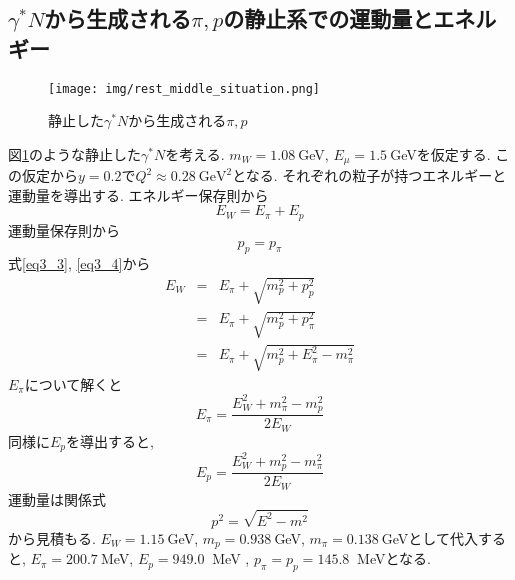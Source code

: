 \subsection{$\gamma^* N$から生成される$\pi,p$の静止系での運動量とエネルギー}
\begin{figure}[H]
    \centering
    \texttt{[image: img/rest\_middle\_situation.png]}
    \caption{静止した$\gamma^* N$から生成される$\pi,p$}
    \label{fig:angle5}
\end{figure}
図\ref{fig:angle5}のような静止した$\gamma^* N$を考える.
$m_W = 1.08 \ $GeV, $E_\mu = 1.5 \ $GeVを仮定する.
この仮定から$y = 0.2$で$Q^2 \approx 0.28 \ \mathrm{GeV^2}$となる.
それぞれの粒子が持つエネルギーと運動量を導出する.
エネルギー保存則から
\begin{equation}
    \label{eq3_3}
    E_W = E_\pi + E_p
\end{equation}
運動量保存則から
\begin{equation}
    \label{eq3_4}
    p_p = p_\pi
\end{equation}
式\ref{eq3_3}, \ref{eq3_4}から
\begin{eqnarray}
    E_W  & =  & E_\pi + \sqrt{m_p^2 + p_p^2} \\
    & = & E_\pi + \sqrt{m_p^2 + p_\pi^2} \\
    & = & E_\pi + \sqrt{m_p^2 + E_\pi^2 - m_\pi^2}
\end{eqnarray}
$E_\pi$について解くと
\begin{equation}
    E_\pi = \dfrac{E_W ^2 + m_\pi ^2 - m_p ^2}{2E_W}
\end{equation}
同様に$E_p$を導出すると,
\begin{equation}
    E_p = \dfrac{E_W ^2 + m_p ^2 - m_\pi ^2}{2E_W}
\end{equation}
運動量は関係式
\begin{equation}
    p^2 = \sqrt{E^2 - m^2}
\end{equation}
から見積もる.
$E_W = 1.15 \ $GeV, $m_p = 0.938 \ $GeV, $m_\pi = 0.138 \ $GeVとして代入すると,
$E_π = 200.7 \ $MeV, $E_p = 949.0 \ $ MeV , $p_π = p_p = 145.8 \ $ MeVとなる.

